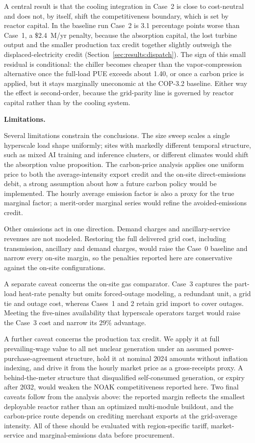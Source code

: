 \documentclass[a4paper,fleqn]{cas-sc}
\newcommand{\runinhead}[1]{\par\smallskip\noindent\textbf{#1.}\quad}
\begin{document}
A central result is that the cooling integration in Case~2 is close to cost-neutral and does not, by itself, shift the competitiveness boundary, which is set by reactor capital. In the baseline run Case~2 is 3.1 percentage points worse than Case~1, a \$2.4~M/yr penalty, because the absorption capital, the lost turbine output and the smaller production tax credit together slightly outweigh the displaced-electricity credit (Section~\ref{sec:results:dispatch}). The sign of this small residual is conditional: the chiller becomes cheaper than the vapor-compression alternative once the full-load PUE exceeds about 1.40, or once a carbon price is applied, but it stays marginally uneconomic at the COP-3.2 baseline. Either way the effect is second-order, because the grid-parity line is governed by reactor capital rather than by the cooling system.

\runinhead{Limitations}
\label{sec:results:limitations}

Several limitations constrain the conclusions. The size sweep scales a single hyperscale load shape uniformly; sites with markedly different temporal structure, such as mixed AI training and inference clusters, or different climates would shift the absorption value proposition. The carbon-price analysis applies one uniform price to both the average-intensity export credit and the on-site direct-emissions debit, a strong assumption about how a future carbon policy would be implemented. The hourly average emission factor is also a proxy for the true marginal factor; a merit-order marginal series would refine the avoided-emissions credit.

Other omissions act in one direction. Demand charges and ancillary-service revenues are not modeled. Restoring the full delivered grid cost, including transmission, ancillary and demand charges, would raise the Case~0 baseline and narrow every on-site margin, so the penalties reported here are conservative against the on-site configurations.

A separate caveat concerns the on-site gas comparator. Case~3 captures the part-load heat-rate penalty but omits forced-outage modeling, a redundant unit, a grid tie and outage cost, whereas Cases~1 and 2 retain grid import to cover outages. Meeting the five-nines availability that hyperscale operators target would raise the Case~3 cost and narrow its 29\% advantage.

A further caveat concerns the production tax credit. We apply it at full prevailing-wage value to all net nuclear generation under an assumed power-purchase-agreement structure, hold it at nominal 2024 amounts without inflation indexing, and drive it from the hourly market price as a gross-receipts proxy. A behind-the-meter structure that disqualified self-consumed generation, or expiry after 2032, would weaken the NOAK competitiveness reported here. Two final caveats follow from the analysis above: the reported margin reflects the smallest deployable reactor rather than an optimized multi-module buildout, and the carbon-price route depends on crediting merchant exports at the grid-average intensity. All of these should be evaluated with region-specific tariff, market-service and marginal-emissions data before procurement.
\end{document}
